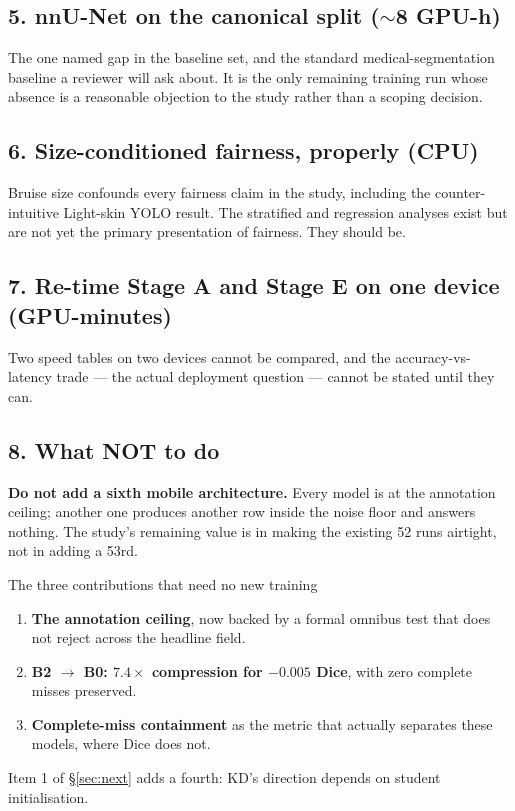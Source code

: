 \documentclass[11pt]{article}
\begin{document}
\subsection*{5. nnU-Net on the canonical split ($\sim$8 GPU-h)}
The one named gap in the baseline set, and the standard medical-segmentation
baseline a reviewer will ask about. It is the only remaining training run whose
absence is a reasonable objection to the study rather than a scoping decision.

\subsection*{6. Size-conditioned fairness, properly (CPU)}
Bruise size confounds every fairness claim in the study, including the
counter-intuitive Light-skin YOLO result. The stratified and regression analyses
exist but are not yet the primary presentation of fairness. They should be.

\subsection*{7. Re-time Stage A and Stage E on one device (GPU-minutes)}
Two speed tables on two devices cannot be compared, and the accuracy-vs-latency
trade --- the actual deployment question --- cannot be stated until they can.

\subsection*{8. What NOT to do}
\textbf{Do not add a sixth mobile architecture.} Every model is at the annotation
ceiling; another one produces another row inside the noise floor and answers
nothing. The study's remaining value is in making the existing 52 runs airtight,
not in adding a 53rd.

\begin{keybox}{The three contributions that need no new training}
\begin{enumerate}[leftmargin=*,itemsep=1pt]
\item \textbf{The annotation ceiling}, now backed by a formal omnibus test that
does not reject across the headline field.
\item \textbf{B2 $\rightarrow$ B0: $7.4\times$ compression for $-0.005$ Dice},
with zero complete misses preserved.
\item \textbf{Complete-miss containment} as the metric that actually separates
these models, where Dice does not.
\end{enumerate}
Item 1 of \S\ref{sec:next} adds a fourth: KD's direction depends on student
initialisation.
\end{keybox}
\end{document}
